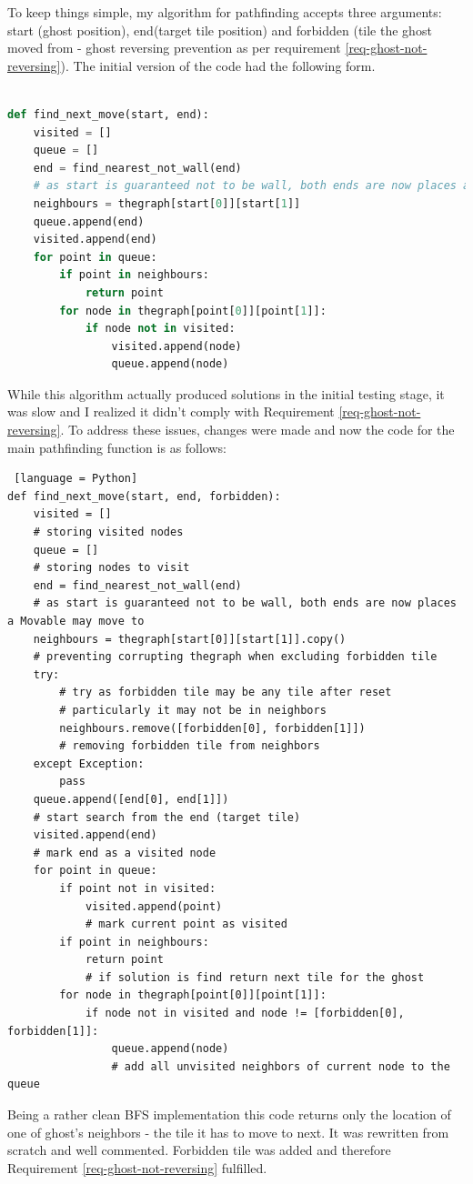 \documentclass[11pt,a4paper]{report}
\begin{document}
				To keep things simple, my algorithm for pathfinding accepts three arguments: start (ghost position), end(target tile position) and forbidden (tile the ghost moved from - ghost reversing prevention as per requirement \ref{req-ghost-not-reversing}).
				The initial version of the code had the following form.
				\begin{lstlisting}[language=Python]

def find_next_move(start, end):
	visited = []
	queue = []
	end = find_nearest_not_wall(end)
	# as start is guaranteed not to be wall, both ends are now places a Movable may move to
	neighbours = thegraph[start[0]][start[1]]
	queue.append(end)
	visited.append(end)
	for point in queue:
		if point in neighbours:
			return point
		for node in thegraph[point[0]][point[1]]:
			if node not in visited:
				visited.append(node)
				queue.append(node)
				\end{lstlisting}
				While this algorithm actually produced solutions in the initial testing stage, it was slow and I realized it didn't comply with Requirement \ref{req-ghost-not-reversing}. To address these issues, changes were made and now the code for the main pathfinding function is as follows:
				\begin{lstlisting} [language = Python]
def find_next_move(start, end, forbidden):
	visited = []
	# storing visited nodes
	queue = []
	# storing nodes to visit
	end = find_nearest_not_wall(end)
	# as start is guaranteed not to be wall, both ends are now places a Movable may move to
	neighbours = thegraph[start[0]][start[1]].copy()
	# preventing corrupting thegraph when excluding forbidden tile
	try:
		# try as forbidden tile may be any tile after reset
		# particularly it may not be in neighbors
		neighbours.remove([forbidden[0], forbidden[1]])
		# removing forbidden tile from neighbors
	except Exception:
		pass
	queue.append([end[0], end[1]])
	# start search from the end (target tile)
	visited.append(end)
	# mark end as a visited node
	for point in queue:
		if point not in visited:
			visited.append(point)
			# mark current point as visited
		if point in neighbours:
			return point
			# if solution is find return next tile for the ghost
		for node in thegraph[point[0]][point[1]]:
			if node not in visited and node != [forbidden[0], forbidden[1]]:
				queue.append(node)
				# add all unvisited neighbors of current node to the queue
				\end{lstlisting}
Being a rather clean BFS implementation this code returns only the location of one of ghost's neighbors - the tile it has to move to next. It was rewritten from scratch and well commented. Forbidden tile was added and therefore Requirement \ref{req-ghost-not-reversing} fulfilled.
\end{document}
